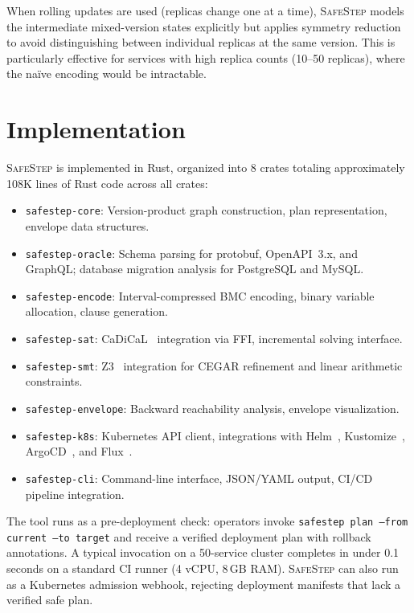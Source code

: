 \documentclass[10pt,twocolumn]{article}
\newcommand{\safestep}{\textsc{SafeStep}}
\begin{document}
When rolling updates are used (replicas change one at a time),
\safestep{} models the intermediate mixed-version states
explicitly but applies symmetry reduction to avoid
distinguishing between individual replicas at the same version.
This is particularly effective for services with high replica
counts (10--50 replicas), where the na\"ive encoding would be
intractable.

\section{Implementation}
\label{sec:impl}

\safestep{} is implemented in Rust, organized into 8 crates
totaling approximately 108K lines of Rust code across all crates:

\begin{itemize}[leftmargin=*,nosep]
  \item \texttt{safestep-core}: Version-product graph
    construction, plan representation, envelope data
    structures.
  \item \texttt{safestep-oracle}: Schema parsing for
    protobuf, OpenAPI~3.x, and GraphQL; database migration
    analysis for PostgreSQL and MySQL.
  \item \texttt{safestep-encode}: Interval-compressed BMC
    encoding, binary variable allocation, clause generation.
  \item \texttt{safestep-sat}: CaDiCaL~\cite{cadical}
    integration via FFI, incremental solving interface.
  \item \texttt{safestep-smt}: Z3~\cite{z3} integration for
    CEGAR refinement and linear arithmetic constraints.
  \item \texttt{safestep-envelope}: Backward reachability
    analysis, envelope visualization.
  \item \texttt{safestep-k8s}: Kubernetes API client,
    integrations with Helm~\cite{helm},
    Kustomize~\cite{kustomize}, ArgoCD~\cite{argocd}, and
    Flux~\cite{flux}.
  \item \texttt{safestep-cli}: Command-line interface,
    JSON/YAML output, CI/CD pipeline integration.
\end{itemize}

\noindent
The tool runs as a pre-deployment check: operators invoke
\texttt{safestep plan --from current --to target} and receive
a verified deployment plan with rollback annotations. A
typical invocation on a 50-service cluster completes in under
0.1 seconds on a standard CI runner (4 vCPU, 8\,GB RAM).
\safestep{} can also run as a Kubernetes admission webhook,
rejecting deployment manifests that lack a verified safe plan.
\end{document}
